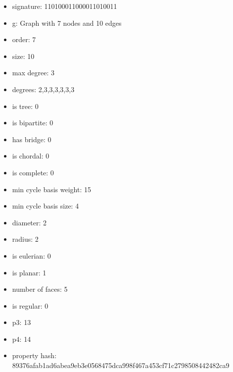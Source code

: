 \begin{itemize}
\item signature: 110100011000011010011
\item g: Graph with 7 nodes and 10 edges
\item order: 7
\item size: 10
\item max degree: 3
\item degrees: 2,3,3,3,3,3,3
\item is tree: 0
\item is bipartite: 0
\item has bridge: 0
\item is chordal: 0
\item is complete: 0
\item min cycle basis weight: 15
\item min cycle basis size: 4
\item diameter: 2
\item radius: 2
\item is eulerian: 0
\item is planar: 1
\item number of faces: 5
\item is regular: 0
\item p3: 13
\item p4: 14
\item property hash: 89376afab1ad6abea9eb3e0568475dca998f467a453cf71c2798508442482ca9
\end{itemize}
\newpage
\begin{figure}
\end{figure}
